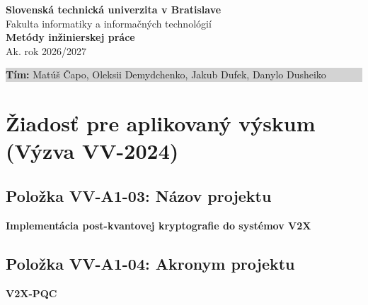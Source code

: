 \documentclass[11pt, a4paper]{article}
\begin{document}
\begin{center}
    {\Large \textbf{Slovenská technická univerzita v Bratislave}}\\[2pt]
    {\large Fakulta informatiky a informačných technológií}\\[15pt]
    {\LARGE \textbf{\color{primary} Metódy inžinierskej práce}}\\[4pt]
    {\large Ak. rok 2026/2027}
\end{center}

\vspace{10pt}

\begin{center}
    \colorbox{lightgray}{
        \parbox{0.95\textwidth}{
            \vspace{4pt}
            \textbf{Tím:} Matúš Čapo, Oleksii Demydchenko, Jakub Dufek, Danylo Dusheiko \hfill \\[2pt]
            \vspace{4pt}
        }
    }
\end{center}

\vspace{15pt}

\section*{Žiadosť pre aplikovaný výskum (Výzva VV-2024)}

\vspace{10pt}

\subsection*{Položka VV-A1-03: Názov projektu}
\textbf{\large Implementácia post-kvantovej kryptografie do systémov V2X}

\vspace{15pt}

\subsection*{Položka VV-A1-04: Akronym projektu}
\textbf{\large V2X-PQC}

\vspace{15pt}
\end{document}
